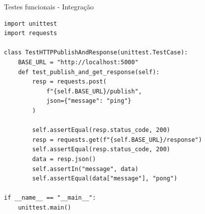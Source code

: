 
\begin{frame}[fragile]{Testes funcionais - Integração}
\begin{lstlisting}[basicstyle=\ttfamily\scriptsize]
import unittest
import requests

class TestHTTPPublishAndResponse(unittest.TestCase):
    BASE_URL = "http://localhost:5000"
    def test_publish_and_get_response(self):
        resp = requests.post(
            f"{self.BASE_URL}/publish",
            json={"message": "ping"}
        )

        self.assertEqual(resp.status_code, 200)
        resp = requests.get(f"{self.BASE_URL}/response")
        self.assertEqual(resp.status_code, 200)
        data = resp.json()
        self.assertIn("message", data)
        self.assertEqual(data["message"], "pong")

if __name__ == "__main__":
    unittest.main()
\end{lstlisting}
\end{frame}